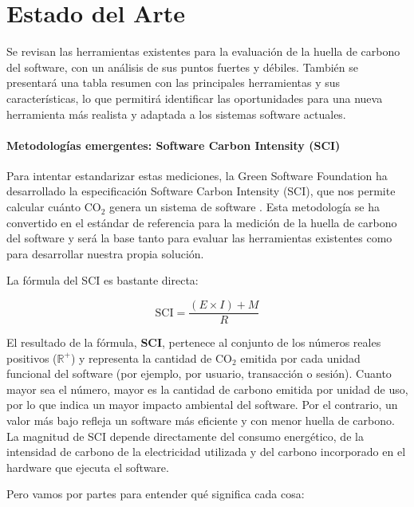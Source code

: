 \documentclass[12pt,a4paper]{report}
\begin{document}
\chapter{Estado del Arte}

Se revisan las herramientas existentes para la evaluación de la huella de
carbono del software, con un análisis de sus puntos fuertes y débiles. También
se presentará una tabla resumen con las principales herramientas y sus
características, lo que permitirá identificar las oportunidades para una nueva
herramienta más realista y adaptada a los sistemas software actuales.

\subsubsection{Metodologías emergentes: Software Carbon Intensity (SCI)}

Para intentar estandarizar estas mediciones, la Green Software Foundation ha desarrollado la especificación Software Carbon Intensity (SCI), que nos permite calcular cuánto CO$_2$ genera un sistema de software \cite{ref6}. Esta metodología se ha convertido en el estándar de referencia para la medición de la huella de carbono del software y será la base tanto para evaluar las herramientas existentes como para desarrollar nuestra propia solución.

La fórmula del SCI es bastante directa:

\begin{equation}
  \text{SCI} = \frac{(E \times I) + M}{R}
\end{equation}

El resultado de la fórmula, \textbf{SCI}, pertenece al conjunto de los números reales positivos ($\mathbb{R}^{+}$) y representa la cantidad de CO$_2$ emitida por cada unidad funcional del software (por ejemplo, por usuario, transacción o sesión). Cuanto mayor sea el número, mayor es la cantidad de carbono emitida por unidad de uso, por lo que indica un mayor impacto ambiental del software. Por el contrario, un valor más bajo refleja un software más eficiente y con menor huella de carbono. La magnitud de SCI depende directamente del consumo energético, de la intensidad de carbono de la electricidad utilizada y del carbono incorporado en el hardware que ejecuta el software.

Pero vamos por partes para entender qué significa cada cosa:
\end{document}

